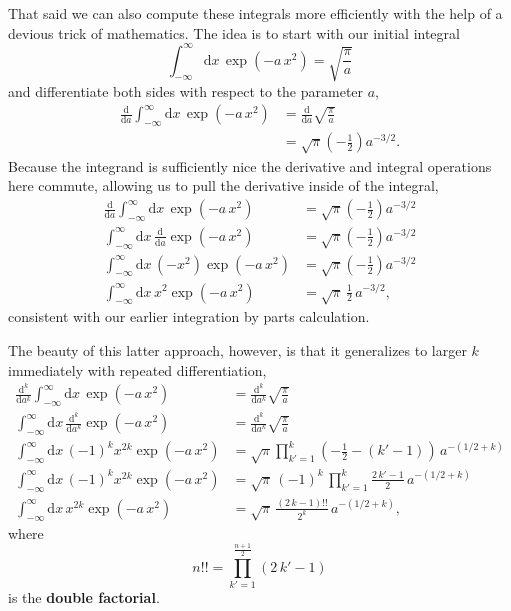 \documentclass[
  letterpaper,
  DIV=11,
  numbers=noendperiod]{scrartcl}
\begin{document}
That said we can also compute these integrals more efficiently with the
help of a devious trick of mathematics. The idea is to start with our
initial integral \[
\int_{-\infty}^{\infty} \mathrm{d} x \, \exp \left( -a \, x^{2} \right)
=
\sqrt{ \frac{\pi}{a} }
\] and differentiate both sides with respect to the parameter \(a\),
\begin{align*}
\frac{\mathrm{d}}{\mathrm{d} a}
\int_{-\infty}^{\infty} \mathrm{d} x \, \exp \left( -a \, x^{2} \right)
&=
\frac{\mathrm{d}}{\mathrm{d} a}
\sqrt{ \frac{\pi}{a} }
\\
&=
\sqrt{\pi} \left( - \frac{1}{2} \right) a^{-3/2}.
\end{align*} Because the integrand is sufficiently nice the derivative
and integral operations here commute, allowing us to pull the derivative
inside of the integral, \begin{align*}
\frac{\mathrm{d}}{\mathrm{d} a }
\int_{-\infty}^{\infty} \mathrm{d} x \, \exp \left( -a \, x^{2} \right)
&=
\sqrt{\pi} \left( - \frac{1}{2} \right) a^{-3/2}
\\
\int_{-\infty}^{\infty} \mathrm{d} x \,
\frac{\mathrm{d}}{\mathrm{d} a} \exp \left( -a \, x^{2} \right)
&=
\sqrt{\pi} \left( - \frac{1}{2} \right) a^{-3/2}
\\
\int_{-\infty}^{\infty} \mathrm{d} x \,
\left( -x^{2} \right) \exp \left( -a \, x^{2} \right)
&=
\sqrt{\pi} \left( - \frac{1}{2} \right) a^{-3/2}
\\
\int_{-\infty}^{\infty} \mathrm{d} x \,
x^{2} \exp \left( -a \, x^{2} \right)
&=
\sqrt{\pi} \, \frac{1}{2} \, a^{-3/2},
\end{align*} consistent with our earlier integration by parts
calculation.

The beauty of this latter approach, however, is that it generalizes to
larger \(k\) immediately with repeated differentiation, \begin{align*}
\frac{\mathrm{d}^{k}}{\mathrm{d} a^{k}}
\int_{-\infty}^{\infty} \mathrm{d} x \, \exp \left( -a \, x^{2} \right)
&=
\frac{\mathrm{d}^{k}}{\mathrm{d} a^{k}}
\sqrt{ \frac{\pi}{a} }
\\
\int_{-\infty}^{\infty} \mathrm{d} x \,
\frac{\mathrm{d}^{k}}{\mathrm{d} a^{k}} \exp \left( -a \, x^{2} \right)
&=
\frac{\mathrm{d}^{k}}{\mathrm{d} a^{k}}
\sqrt{ \frac{\pi}{a} }
\\
\int_{-\infty}^{\infty} \mathrm{d} x \,
(-1)^{k} x^{2 k} \exp \left( -a \, x^{2} \right)
&=
\sqrt{\pi}
\prod_{k' = 1}^{k} \left(-\frac{1}{2} - (k' - 1) \right)
\, a^{-(1/2 + k)}
\\
\int_{-\infty}^{\infty} \mathrm{d} x \,
(-1)^{k} x^{2 k} \exp \left( -a \, x^{2} \right)
&=
\sqrt{\pi} \, (-1)^{k} \,
\prod_{k' = 1}^{k} \frac{2 \, k' - 1}{2} \,
a^{-(1/2 + k)}
\\
\int_{-\infty}^{\infty} \mathrm{d} x \,
x^{2 k} \exp \left( -a \, x^{2} \right)
&=
\sqrt{\pi} \, \frac{ (2 \, k - 1)!! }{2^{k}} \, a^{-(1/2 + k)},
\end{align*} where \[
n!! = \prod_{k' = 1}^{\frac{n + 1}{2}} (2 \, k' - 1)
\] is the \textbf{double factorial}.
\end{document}
